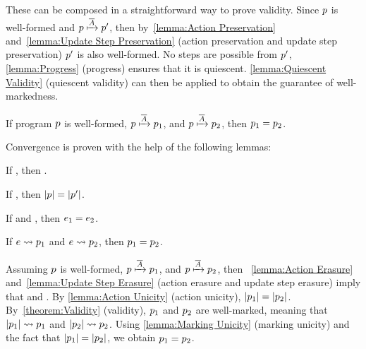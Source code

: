 These can be composed in a straightforward way to prove validity. Since $p$ is well-formed and $p\xmapsto{\overline{\ensuremath{A}}}p'$, then by~\autoref{lemma:Action Preservation} and~\autoref{lemma:Update Step Preservation} (action preservation and update step preservation) $p'$ is also well-formed. No steps are possible from $p'$, \autoref{lemma:Progress} (progress) ensures that it is quiescent. \autoref{lemma:Quiescent Validity} (quiescent validity) can then be applied to obtain the guarantee of well-markedness. 

\begin{theorem}[Convergence]
    If program $p$ is well-formed, $p\xmapsto{\overline{\ensuremath{A}}}p_1$, and $p\xmapsto{\overline{\ensuremath{A}}}p_2$, then $p_1=p_2$. 
\end{theorem}

Convergence is proven with the help of the following lemmas:

\begin{lemma}
\label{lemma:Action Erasure}
    If , then
    .
\end{lemma}

\begin{lemma}
\label{lemma:Update Step Erasure}
    If , then
    ${|p|}={|p'|}$.
\end{lemma}

\begin{lemma}
\label{lemma:Action Unicity}
    If  and , then $e_1=e_2$.
\end{lemma}

\begin{lemma}
\label{lemma:Marking Unicity}
    If $e\leadsto p_1$ and $e\leadsto p_2$, then $p_1=p_2$.  
\end{lemma}

Assuming $p$ is well-formed, $p\xmapsto{\overline{\ensuremath{A}}}p_1$, and $p\xmapsto{\overline{\ensuremath{A}}}p_2$, then ~\autoref{lemma:Action Erasure} and~\autoref{lemma:Update Step Erasure} (action erasure and update step erasure) imply that  and . By \autoref{lemma:Action Unicity} (action unicity), $|p_1|=|p_2|$. By~\autoref{theorem:Validity} (validity), $p_1$ and $p_2$ are well-marked, meaning that $|p_1|\leadsto p_1$ and $|p_2|\leadsto p_2$. Using \autoref{lemma:Marking Unicity} (marking unicity) and the fact that $|p_1|=|p_2|$, we obtain $p_1=p_2$.   


